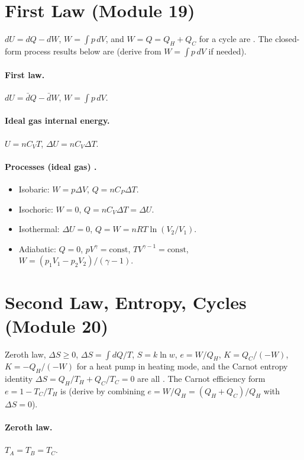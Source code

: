 \documentclass[11pt]{article}
\begin{document}
\section{First Law (Module 19)}
$dU = dQ - dW$, $W = \int p\,dV$, and $W = Q = Q_H + Q_C$ for a cycle are
. The closed-form process results below are
 (derive from $W = \int p\,dV$ if needed).

\paragraph{First law.} $dU = \bar dQ - \bar dW$, $W = \int p\,dV$.
\paragraph{Ideal gas internal energy.} $U = nC_V T$, $\Delta U = nC_V\Delta T$.

\paragraph{Processes (ideal gas) .}
\begin{itemize}\itemsep0pt
\item Isobaric: $W = p\Delta V$, $Q = nC_P\Delta T$.
\item Isochoric: $W = 0$, $Q = nC_V\Delta T = \Delta U$.
\item Isothermal: $\Delta U = 0$, $Q = W = nRT\ln(V_2/V_1)$.
\item Adiabatic: $Q = 0$, $pV^{\gamma} = \text{const}$, $TV^{\gamma-1} = \text{const}$, $W = (p_1V_1 - p_2V_2)/(\gamma - 1)$.
\end{itemize}

\section{Second Law, Entropy, Cycles (Module 20)}
Zeroth law, $\Delta S \ge 0$, $\Delta S = \int dQ/T$, $S = k\ln w$, $e = W/Q_H$,
$K = Q_C/(-W)$, $K = -Q_H/(-W)$ for a heat pump in heating mode, and the
Carnot entropy identity $\Delta S = Q_H/T_H + Q_C/T_C = 0$ are all
. The Carnot efficiency form $e = 1 - T_C/T_H$ is
 (derive by combining $e = W/Q_H = (Q_H+Q_C)/Q_H$ with
$\Delta S = 0$).

\paragraph{Zeroth law.} $T_A = T_B = T_C$.
\end{document}
